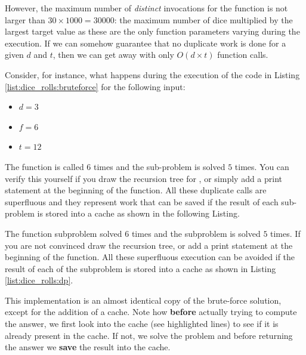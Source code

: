 However, the maximum number of \textit{distinct} invocations for the function
 is not larger than $30\times 1000 = 30000$: the maximum number of dice multiplied by the largest target value as these are the only function parameters varying during the execution. If we can somehow guarantee that no
duplicate work is done for a given $d$ and $t$, then we can get away with only $O(d\times t)$
function calls. 

Consider, for instance, what happens during the execution of the code
in Listing \ref{list:dice_rolls:bruteforce} for the following input:
\begin{itemize}
	\item $d = 3$
	\item $f = 6$
	\item $t = 12$
\end{itemize}


The function  is called  $6$ times and the
sub-problem  is solved $5$ times.
You can verify this yourself if you draw the recursion tree for , or simply add a print statement at the beginning of the function.
All these duplicate calls are superfluous and they represent work that can be saved if the result of each sub-problem is stored into a
cache as shown in the following Listing.


The function subproblem  solved $6$ times and the
subproblem  is solved $5$ times. If you are not
convinced draw the recursion tree, or add a print statement at the beginning of the function. All
these superfluous execution can be avoided if the result of each of the subproblem is stored into a cache as shown in Listing \ref{list:dice_rolls:dp}. 




This implementation is an almost identical copy
of the brute-force solution, except for the addition of a cache. Note how \textbf{before} actually trying
to compute the answer, we first look into the cache (see highlighted lines) to see if it is already present in the cache. If not, we solve the
problem and before returning the answer we \textbf{save} the result into the cache.

